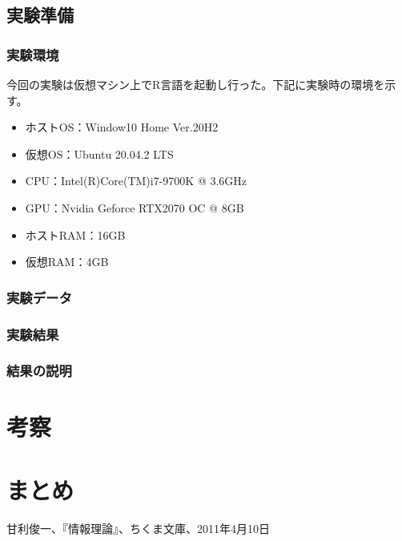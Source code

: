 \documentclass[dvipdfmx]{jsarticle}
\begin{document}
\subsection{実験準備}
  \subsubsection{実験環境}
  今回の実験は仮想マシン上でR言語を起動し行った。下記に実験時の環境を示す。
  \begin{itemize}
    \item ホストOS：Window10 Home Ver.20H2
    \item 仮想OS：Ubuntu 20.04.2 LTS
    \item CPU：Intel(R)Core(TM)i7-9700K @ 3.6GHz
    \item GPU：Nvidia Geforce RTX2070 OC @ 8GB
    \item ホストRAM：16GB
    \item 仮想RAM：4GB
  \end{itemize}
\subsubsection{実験データ}
\subsubsection{実験結果}
\subsubsection{結果の説明}
\section{考察}
\section{まとめ}
\begin{thebibliography}{99}
   甘利俊一、『情報理論』、ちくま文庫、2011年4月10日
\end{thebibliography}
\end{document}
